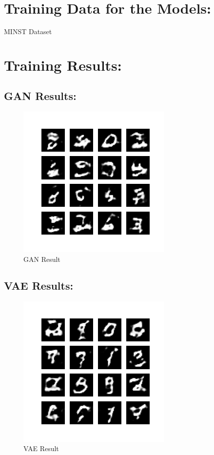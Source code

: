 \documentclass[11pt,usenames]{article}
\begin{document}
	\section{Training Data for the Models:}\label{section:TrainingDatas}
	MINST Dataset	
	
	\section{Training Results:}\label{section:TrainingResults}
	
	\subsection{GAN Results:}\label{subsection:GAN_Results}
	
	\begin{figure}[htpb]
		\centering
		\includegraphics[scale=1]{GAN_image_at_epoch_0001.png}
		\caption{GAN Result}
		\label{fig:FigureLabel1}
	\end{figure}

	\subsection{VAE Results:}\label{subsection:VAE_Results}	
	\begin{figure}[htpb]
		\centering
		\includegraphics[scale=1]{GAN_image_at_epoch_0002.png}
		\caption{VAE Result}
		\label{fig:FigureLabel1}
	\end{figure}	
	
\end{document}
